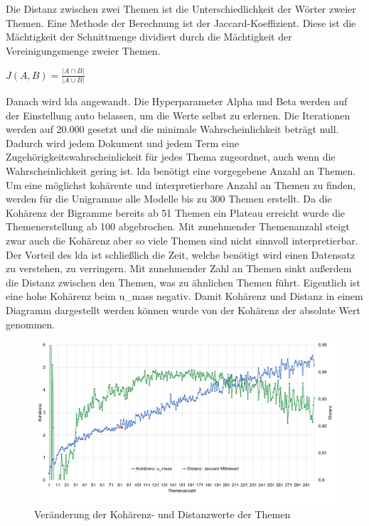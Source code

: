 Die Distanz zwischen zwei Themen ist die Unterschiedlichkeit der Wörter zweier Themen. Eine Methode der Berechnung ist der Jaccard-Koeffizient. Diese ist die Mächtigkeit der Schnittmenge dividiert durch die Mächtigkeit der Vereinigungsmenge zweier Themen.


\begin{center}
	$J(A,B) = \frac{\left|A \cap B\right|}{\left|A \cup B\right|}$ 
\end{center}


Danach wird \ac{lda} angewandt. Die Hyperparameter Alpha und Beta werden auf der Einstellung auto belassen, um die Werte selbst zu erlernen. Die Iterationen werden auf 20.000 gesetzt und die minimale Wahrscheinlichkeit beträgt null. Dadurch wird jedem Dokument und jedem Term eine Zugehörigkeitswahrscheinlickeit für jedes Thema zugeordnet, auch wenn die Wahrscheinlichkeit gering ist. \ac{lda} benötigt eine vorgegebene Anzahl an Themen. Um eine möglichst kohärente und interpretierbare Anzahl an Themen zu finden, werden für die Unigramme alle Modelle bis zu 300 Themen erstellt. Da die Kohärenz der Bigramme bereits ab 51 Themen ein Plateau erreicht wurde die Themenerstellung ab 100 abgebrochen. Mit zunehmender Themenanzahl steigt zwar auch die Kohärenz aber so viele Themen sind nicht sinnvoll interpretierbar. Der Vorteil des \ac{lda} ist schließlich die Zeit, welche benötigt wird einen Datensatz zu verstehen, zu verringern. Mit zunehmender Zahl an Themen sinkt außerdem die Distanz zwischen den Themen, was zu ähnlichen Themen führt. Eigentlich ist eine hohe Kohärenz beim u\_mass negativ. Damit Kohärenz und Distanz in einem Diagramm dargestellt werden können wurde von der Kohärenz der absolute Wert genommen.

\begin{landscape}
\begin{figure}[htpb]
	\centering
	\includegraphics[width=\textwidth,keepaspectratio=true]{img/coherenceAndDistanceUnigram.png}
	\caption{
		Veränderung der Kohärenz- und Distanzwerte der Themen
	}
	\label{fig:Kohärenz_Distanz_Unigramme}
\end{figure}
\end{landscape}


